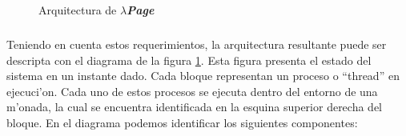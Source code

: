 \documentclass[a4paper]{article}
\newcommand{\hpage}{\textbf{\textsl{$\lambda$Page}}}
\begin{document}
\begin{figure}[hp]
	\begin{center}
		\caption{Arquitectura de \hpage}
		\label{arq1}
	\end{center}
\end{figure}
\subparagraph{}Teniendo en cuenta estos requerimientos, la arquitectura resultante puede ser descripta con el diagrama de la figura \ref{arq1}.  Esta figura presenta el estado del sistema en un instante dado.  Cada bloque representan un proceso o ``thread'' en ejecuci'on.  Cada uno de estos procesos se ejecuta dentro del entorno de una m'onada, la cual se encuentra identificada en la esquina superior derecha del bloque.  En el diagrama podemos identificar los siguientes componentes:
\end{document}
